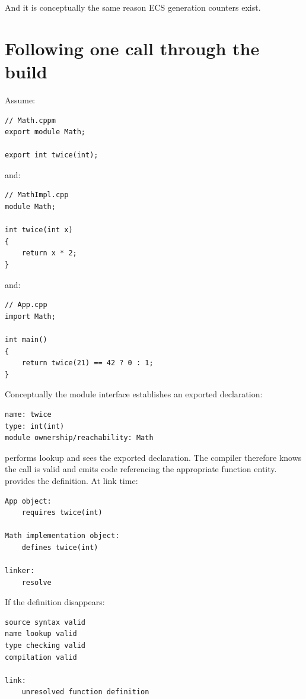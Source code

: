 And it is conceptually the same reason ECS generation counters exist.

\section{Following one call through the build}\label{01-foundations-i-ch003-following-one-call-through-the-build}

\hypertarget{01-foundations-i-ch003-following-one-call-through-the-build}{}

Assume:

\begin{verbatim}
// Math.cppm
export module Math;

export int twice(int);
\end{verbatim}

and:

\begin{verbatim}
// MathImpl.cpp
module Math;

int twice(int x)
{
    return x * 2;
}
\end{verbatim}

and:

\begin{verbatim}
// App.cpp
import Math;

int main()
{
    return twice(21) == 42 ? 0 : 1;
}
\end{verbatim}

Conceptually the module interface establishes an exported declaration:

\begin{verbatim}
name: twice
type: int(int)
module ownership/reachability: Math
\end{verbatim}

 performs lookup and sees the exported declaration. The compiler therefore knows the call is valid and emits code referencing the appropriate function entity.  provides the definition. At link time:

\begin{verbatim}
App object:
    requires twice(int)

Math implementation object:
    defines twice(int)

linker:
    resolve
\end{verbatim}

If the definition disappears:

\begin{verbatim}
source syntax valid
name lookup valid
type checking valid
compilation valid

link:
    unresolved function definition
\end{verbatim}

